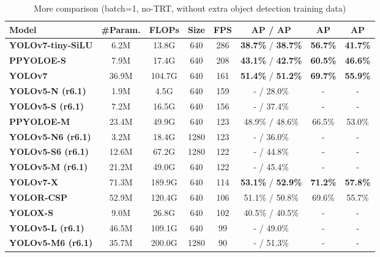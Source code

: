 \documentclass[10pt,twocolumn,letterpaper]{article}
\begin{document}
		
		\begin{table*}[t]
			\centering
			\begin{threeparttable}[t]
				\footnotesize
				\caption{More comparison (batch=1, no-TRT, without extra object detection training data)}
				\label{table:more}
\begin{tabular}{l|c|c|c|c|c|c|c}
					\toprule
					\textbf{Model} & \textbf{\#Param.} & \textbf{FLOPs} & \textbf{Size} & \textbf{FPS} & \textbf{AP} / \textbf{AP} & \textbf{AP} & \textbf{AP} \\
					\midrule
					\textbf{YOLOv7-tiny-SiLU} & 6.2M & 13.8G & 640 & 286 & \textbf{38.7\%} / \textbf{38.7\%} & \textbf{56.7\%} & \textbf{41.7\%} \\
					\textbf{PPYOLOE-S \cite{xu2022pp}} & 7.9M & 17.4G & 640 & 208 &\textbf{ 43.1\%} / \textbf{42.7\%} & \textbf{60.5\%} & \textbf{46.6\%} \\
					\midrule
					\textbf{YOLOv7} & 36.9M & 104.7G & 640 & 161 & \textbf{51.4\%} / \textbf{51.2\%} & \textbf{69.7\%} & \textbf{55.9\%} \\
					\textbf{YOLOv5-N (r6.1) \cite{glenn2022yolov5}} & 1.9M & 4.5G & 640 & 159 & - / 28.0\% & - & - \\
					\textbf{YOLOv5-S (r6.1) \cite{glenn2022yolov5}} & 7.2M & 16.5G & 640 & 156 & - / 37.4\% & - & - \\
					\textbf{PPYOLOE-M \cite{xu2022pp}} & 23.4M & 49.9G & 640 & 123 & 48.9\% / 48.6\% & 66.5\% & 53.0\% \\
					\textbf{YOLOv5-N6 (r6.1) \cite{glenn2022yolov5}} & 3.2M & 18.4G & 1280 & 123 & - / 36.0\% & - & - \\
					\textbf{YOLOv5-S6 (r6.1) \cite{glenn2022yolov5}} & 12.6M & 67.2G & 1280 & 122 & - / 44.8\% & - & -\\
					\textbf{YOLOv5-M (r6.1) \cite{glenn2022yolov5}} & 21.2M & 49.0G & 640 & 122 & - / 45.4\% & - & - \\
					\textbf{YOLOv7-X} & 71.3M & 189.9G & 640 & 114 & \textbf{53.1\%} / \textbf{52.9\%} & \textbf{71.2\%} & \textbf{57.8\%} \\
					\textbf{YOLOR-CSP \cite{wang2021you}} & 52.9M & 120.4G & 640 & 106 & 51.1\% / 50.8\% & 69.6\% & 55.7\% \\
					\textbf{YOLOX-S \cite{ge2021yolox}} & 9.0M & 26.8G & 640 & 102 & 40.5\% / 40.5\% & - & - \\
					\midrule
					\textbf{YOLOv5-L (r6.1) \cite{glenn2022yolov5}} & 46.5M & 109.1G & 640 & 99 & - / 49.0\% & - & - \\
					\textbf{YOLOv5-M6 (r6.1) \cite{glenn2022yolov5}} & 35.7M & 200.0G & 1280 & 90 & - / 51.3\% & - & - \\

\end{tabular}
\end{threeparttable}
\end{table*}
\end{document}
